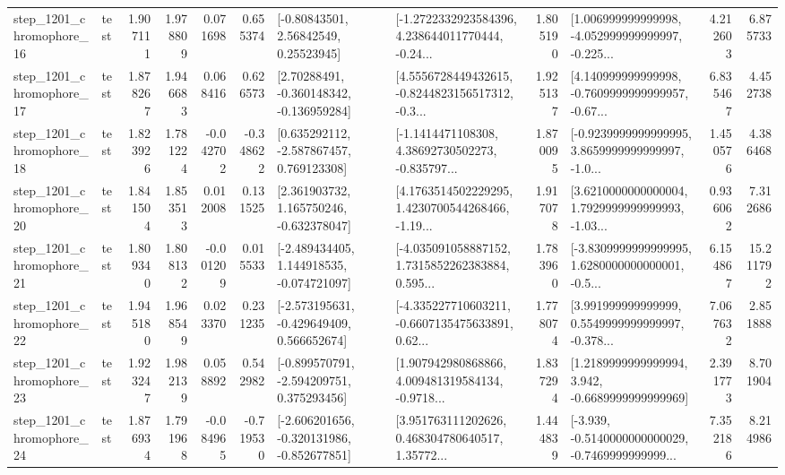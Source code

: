 \begin{tabular}{llrrrrllrlrr}
 step\_1201\_chromophore\_16 &      test &      1.907111 &    1.978809 &      0.071698 &  0.655374 &       [-0.80843501, 2.56842549, 0.25523945] &  [-1.2722332923584396, 4.238644011770444, -0.24... &       1.805190 &  [1.006999999999998, -4.052999999999997, -0.225... &            4.212603 &          6.875733 \\
 step\_1201\_chromophore\_17 &      test &      1.878267 &    1.946683 &      0.068416 &  0.626573 &    [2.70288491, -0.360148342, -0.136959284] &  [4.5556728449432615, -0.8244823156517312, -0.3... &       1.925137 &  [4.140999999999998, -0.7609999999999957, -0.67... &            6.835467 &          4.452738 \\
 step\_1201\_chromophore\_18 &      test &      1.823926 &    1.781224 &     -0.042702 & -0.348622 &    [0.635292112, -2.587867457, 0.769123308] &  [-1.1414471108308, 4.38692730502273, -0.835797... &       1.870095 &  [-0.9239999999999995, 3.8659999999999997, -1.0... &            1.450576 &          4.386468 \\
 step\_1201\_chromophore\_20 &      test &      1.841504 &    1.853513 &      0.012008 &  0.131525 &    [2.361903732, 1.165750246, -0.632378047] &  [4.1763514502229295, 1.4230700544268466, -1.19... &       1.917078 &  [3.6210000000000004, 1.7929999999999993, -1.03... &            0.936062 &          7.312686 \\
 step\_1201\_chromophore\_21 &      test &      1.809340 &    1.808132 &     -0.001209 &  0.015533 &   [-2.489434405, 1.144918535, -0.074721097] &  [-4.035091058887152, 1.7315852262383884, 0.595... &       1.783960 &  [-3.8309999999999995, 1.6280000000000001, -0.5... &            6.154867 &         15.211792 \\
 step\_1201\_chromophore\_22 &      test &      1.945180 &    1.968549 &      0.023370 &  0.231235 &   [-2.573195631, -0.429649409, 0.566652674] &  [-4.335227710603211, -0.6607135475633891, 0.62... &       1.778074 &  [3.991999999999999, 0.5549999999999997, -0.378... &            7.067632 &          2.851888 \\
 step\_1201\_chromophore\_23 &      test &      1.923247 &    1.982139 &      0.058892 &  0.542982 &   [-0.899570791, -2.594209751, 0.375293456] &  [1.907942980868866, 4.009481319584134, -0.9718... &       1.837294 &   [1.2189999999999994, 3.942, -0.6689999999999969] &            2.391773 &          8.701904 \\
 step\_1201\_chromophore\_24 &      test &      1.876934 &    1.791968 &     -0.084965 & -0.719530 &  [-2.606201656, -0.320131986, -0.852677851] &  [3.951763111202626, 0.468304780640517, 1.35772... &       1.444839 &  [-3.939, -0.5140000000000029, -0.7469999999999... &            7.352186 &          8.214986 \\

\end{tabular}
